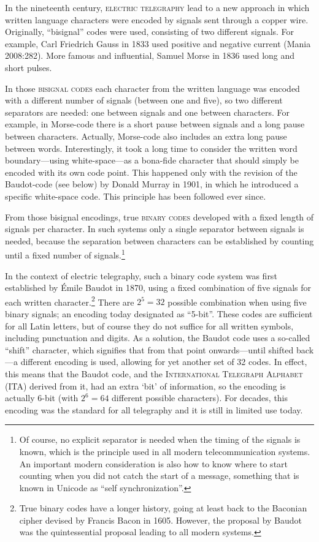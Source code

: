 In the nineteenth century, \textsc{electric telegraphy} lead to a new approach in which written language characters were encoded by signals sent through a copper wire. Originally, ``bisignal'' codes were used, consisting of two different signals. For example, Carl Friedrich Gauss in 1833 used positive and negative current (Mania 2008:282). More famous and influential, Samuel Morse in 1836 used long and short pulses. 

In those \textsc{bisignal codes} each character from the written language was encoded with a different number of signals (between one and five), so two different separators are needed: one between signals and one between characters. For example, in Morse-code there is a short pause between signals and a long pause between characters. Actually, Morse-code also includes an extra long pause between words. Interestingly, it took a long time to consider the written word boundary---using white-space---as a bona-fide character that should simply be encoded with its own code point. This happened only with the revision of the Baudot-code (see below) by Donald Murray in 1901, in which he introduced a specific white-space code. This principle has been followed ever since.

From those bisignal encodings, true \textsc{binary codes} developed with a fixed length of signals per character. In such systems only a single separator between signals is needed, because the separation between characters can be established by counting until a fixed number of signals.\footnote{Of course, no explicit separator is needed when the timing of the signals is known, which is the principle used in all modern telecommunication systems. An important modern consideration is also how to know where to start counting when you did not catch the start of a message, something that is known in Unicode as ``self synchronization''.} 

In the context of electric telegraphy, such a binary code system was first established by Émile Baudot in 1870, using a fixed combination of five signals for each written character.\footnote{True binary codes have a longer history, going at least back to the Baconian cipher devised by Francis Bacon in 1605. However, the proposal by Baudot was the quintessential proposal leading to all modern systems.} There are $2^5 = 32$ possible combination when using five binary signals; an encoding today designated as ``5-bit''. These codes are sufficient for all Latin letters, but of course they do not suffice for all written symbols, including punctuation and digits. As a solution, the Baudot code uses a so-called ``shift'' character, which signifies that from that point onwards---until shifted back---a different encoding is used, allowing for yet another set of 32 codes. In effect, this means that the Baudot code, and the \textsc{International Telegraph Alphabet} (ITA) derived from it, had an extra `bit' of information, so the encoding is actually 6-bit (with $2^6 = 64$ different possible characters). For decades, this encoding was the standard for all telegraphy and it is still in limited use today.

